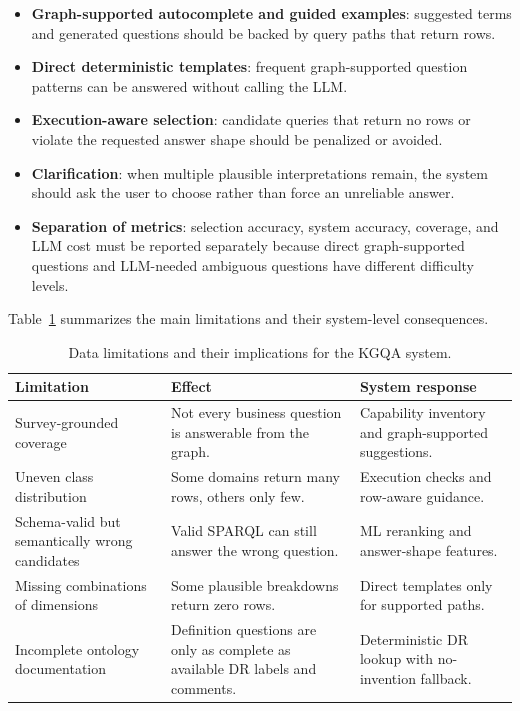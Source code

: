 \documentclass[
  12pt,
  english,
  oneside]{report}
\begin{document}
\begin{itemize}
    \item \textbf{Graph-supported autocomplete and guided examples}: suggested terms and generated questions should be backed by query paths that return rows.
    \item \textbf{Direct deterministic templates}: frequent graph-supported question patterns can be answered without calling the LLM.
    \item \textbf{Execution-aware selection}: candidate queries that return no rows or violate the requested answer shape should be penalized or avoided.
    \item \textbf{Clarification}: when multiple plausible interpretations remain, the system should ask the user to choose rather than force an unreliable answer.
    \item \textbf{Separation of metrics}: selection accuracy, system accuracy, coverage, and LLM cost must be reported separately because direct graph-supported questions and LLM-needed ambiguous questions have different difficulty levels.
\end{itemize}

Table~\ref{tab:data-limitations} summarizes the main limitations and their system-level consequences.

\begin{table}[htbp]
\centering
\caption{Data limitations and their implications for the KGQA system.}
\label{tab:data-limitations}
\small
\begin{tabularx}{\textwidth}{
>{\raggedright\arraybackslash}p{3.8cm}
>{\raggedright\arraybackslash}p{5.2cm}
>{\raggedright\arraybackslash}X
}
\toprule
\textbf{Limitation} & \textbf{Effect} & \textbf{System response} \\
\midrule
Survey-grounded coverage & Not every business question is answerable from the graph. & Capability inventory and graph-supported suggestions. \\
Uneven class distribution & Some domains return many rows, others only few. & Execution checks and row-aware guidance. \\
Schema-valid but semantically wrong candidates & Valid SPARQL can still answer the wrong question. & ML reranking and answer-shape features. \\
Missing combinations of dimensions & Some plausible breakdowns return zero rows. & Direct templates only for supported paths. \\
Incomplete ontology documentation & Definition questions are only as complete as available DR labels and comments. & Deterministic DR lookup with no-invention fallback. \\
\bottomrule
\end{tabularx}
\end{table}
\end{document}
